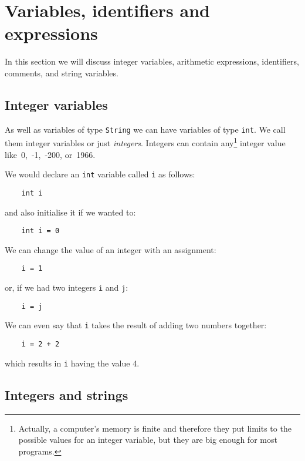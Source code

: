 \section{Variables, identifiers and expressions}

In this section we will discuss integer variables, arithmetic expressions, 
identifiers, comments, and string variables.

\subsection{Integer variables}

As well as variables of type \verb!String! we can have variables of
type \verb!int!. We call them integer variables or just
\emph{integers}. Integers can contain any\footnote{Actually, a computer's memory
  is finite and therefore they put limits to the possible values for an
  integer variable, but they are big enough for most programs.}
integer value like~0,~-1,~-200, or~1966.

We would declare an \verb!int! variable called \verb!i! as follows:

\begin{Verbatim}
    int i
\end{Verbatim}

and also initialise it if we wanted to:

\begin{Verbatim}
    int i = 0
\end{Verbatim}

We can change the value of an integer with an assignment:

\begin{Verbatim}
    i = 1
\end{Verbatim}

or, if we had two integers \verb!i! and \verb!j!:

\begin{Verbatim}
    i = j
\end{Verbatim}

We can even say that \verb.i. takes the result of adding two numbers
together:

\begin{Verbatim}
    i = 2 + 2
\end{Verbatim}

which results in \verb.i. having the value 4. 

\subsection*{Integers and strings}
\label{sec:intstr}

